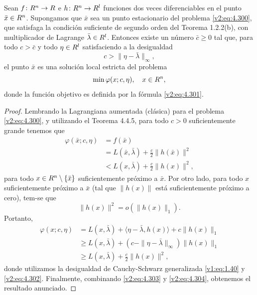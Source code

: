 \begin{proposition}\label{v2:prop:4.6.1}
    Sean $f \colon R^n \to R$ e $h \colon R^n \to R^l$ funciones dos veces diferenciables en el punto $\bar{x} \in R^n$. Supongamos que $\bar{x}$ sea un punto estacionario del problema \eqref{v2:eq:4.300}, que satisfaga la condición suficiente de segundo orden del Teorema 1.2.2(b), con multiplicador de Lagrange $\bar{\lambda} \in R^l$.
    Entonces existe un número $\bar{c} \ge 0$ tal que, para todo $c > \bar{c}$ y todo $\eta \in R^l$ satisfaciendo a la desigualdad
    \begin{equation}
        c > \|\eta - \bar{\lambda}\|_\infty,
        \label{v2:eq:4.302}
    \end{equation}
    el punto $\bar{x}$ es una solución local estricta del problema
    \[
        \min \varphi(x; c, \eta), \quad x \in R^n,
    \]
    donde la función objetivo es definida por la fórmula \eqref{v2:eq:4.301}.
\end{proposition}
\begin{proof}
    Lembrando la Lagrangiana aumentada (clásica) para el problema \eqref{v2:eq:4.300}, y utilizando el Teorema 4.4.5, para todo $c > 0$ suficientemente grande tenemos que
    \begin{align}
        \varphi(\bar{x}; c, \eta) &= f(\bar{x}) \nonumber \\
        &= L(\bar{x}, \bar{\lambda}) + \frac{c}{2}\|h(\bar{x})\|^2 \nonumber \\
        &< L(x, \bar{\lambda}) + \frac{c}{2}\|h(x)\|^2, \label{v2:eq:4.303}
    \end{align}
    para todo $x \in R^n \setminus \{\bar{x}\}$ suficientemente próximo a $\bar{x}$. Por otro lado, para todo $x$ suficientemente próximo a $\bar{x}$ (tal que $\|h(x)\|$ está suficientemente próximo a cero), tem-se que
    \[
        \|h(x)\|^2 = o(\|h(x)\|_1).
    \]
    Portanto,
    \begin{align}
        \varphi(x; c, \eta) &= L(x, \bar{\lambda}) + \langle \eta - \bar{\lambda}, h(x) \rangle + c\|h(x)\|_1 \nonumber \\
        &\ge L(x, \bar{\lambda}) + (c - \|\eta - \bar{\lambda}\|_\infty)\|h(x)\|_1 \nonumber \\
        &\ge L(x, \bar{\lambda}) + \frac{c}{2}\|h(x)\|^2,
        \label{v2:eq:4.304}
    \end{align}
    donde utilizamos la desigualdad de Cauchy-Schwarz generalizada \eqref{v1:eq:1.40} y \eqref{v2:eq:4.302}. Finalmente, combinando \eqref{v2:eq:4.303} y \eqref{v2:eq:4.304}, obtenemos el resultado anunciado.
\end{proof}

